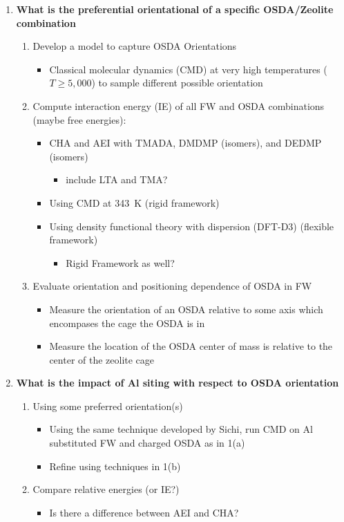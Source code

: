 \documentclass[journal=accacs,manuscript=article, email=true, layout=traditional]{achemso}
\begin{document}
\begin{enumerate}
\item \textbf{What is the preferential orientational of a specific OSDA/Zeolite combination}

\begin{enumerate}
\item Develop a model to capture OSDA Orientations
\begin{itemize}
\item Classical molecular dynamics (CMD) at very high temperatures (\(T \geq 5,000\)) to sample different possible orientation
\end{itemize}

\item Compute interaction energy (IE) of all FW and OSDA combinations (maybe free energies):
\begin{itemize}
\item CHA and AEI with TMADA, DMDMP (isomers), and DEDMP (isomers)
\begin{itemize}
\item include LTA and TMA?
\end{itemize}
\item Using CMD at \SI{343}{K} (rigid framework)
\item Using density functional theory with dispersion (DFT-D3) (flexible framework)
\begin{itemize}
\item Rigid Framework as well?
\end{itemize}
\end{itemize}

\item Evaluate orientation and positioning dependence of OSDA in FW
\begin{itemize}
\item Measure the orientation of an OSDA relative to some axis which encompases the cage the OSDA is in
\item Measure the location of the OSDA center of mass is relative to the center of the zeolite cage
\end{itemize}
\end{enumerate}

\item \textbf{What is the impact of Al siting with respect to OSDA orientation}

\begin{enumerate}
\item Using some preferred orientation(s)
\begin{itemize}
\item Using the same technique developed by Sichi, run CMD on Al substituted FW and charged OSDA as in 1(a)
\item Refine using techniques in 1(b)
\end{itemize}
\item Compare relative energies (or IE?)
\begin{itemize}
\item Is there a difference between AEI and CHA?
\end{itemize}
\end{enumerate}


\end{enumerate}
\end{document}
